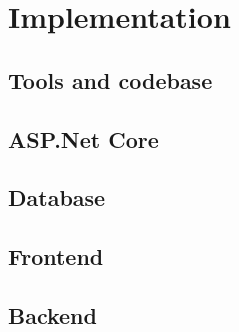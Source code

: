 \chapter{Implementation}

\section{Tools and codebase}
\section{ASP.Net Core}
\section{Database}
\section{Frontend}
\section{Backend}